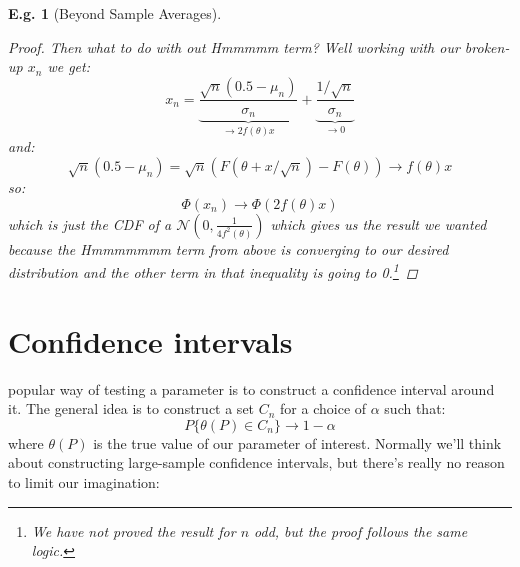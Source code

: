 \documentclass{tufte-book}
\theoremstyle{mytheoremstyle}
\theoremstyle{mylemstyle}
\theoremstyle{mydefstyle}
\newtheorem*{ex}{E.g.}
\begin{document}
\begin{ex}[Beyond Sample Averages]
\begin{proof}
Then what to do with out Hmmmmm term? Well working with our broken-up \(x_n\) we get:
	\[x_n = \underbrace{\frac{\sqrt{n}(0.5 - \mu_n)}{\sigma_n}}_\textrm{\(\rightarrow 2f(\theta)x\)} + \underbrace{\frac{1/\sqrt{n}}{\sigma_n}}_\textrm{\(\rightarrow 0\)}\]
and:
	\[\sqrt{n}(0.5 - \mu_n) = \sqrt{n}(F(\theta + x/\sqrt{n}) - F(\theta)) \rightarrow f(\theta)x\]
so:
	\[\Phi(x_n) \rightarrow \Phi(2f(\theta)x)\]
which is just the CDF of a \(\mathcal{N}\left(0, \frac{1}{4f^2(\theta)}\right)\) which gives us the result we wanted because the Hmmmmmmm term from above is converging to our desired distribution and the other term in that inequality is going to 0.\footnote{We have not proved the result for \(n\) odd, but the proof follows the same logic.}
\end{proof}
\end{ex}
\section{Confidence intervals}
 popular way of testing a parameter is to construct a confidence interval around it. The general idea is to construct a set \(C_n\) for a choice of \(\alpha\) such that:
	\[P\{\theta(P) \in C_n\} \rightarrow 1-\alpha\]
where \(\theta(P)\) is the true value of our parameter of interest. Normally we'll think about constructing large-sample confidence intervals, but there's really no reason to limit our imagination:
\end{document}
